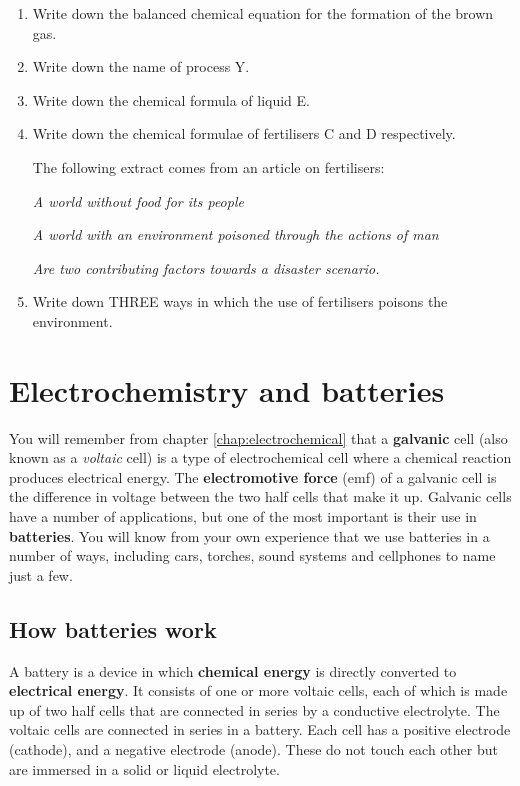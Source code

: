{\begin{enumerate}
\item{Write down the balanced chemical equation for the formation of the brown gas.}
\item{Write down the name of process Y.}
\item{Write down the chemical formula of liquid E.}
\item{Write down the chemical formulae of fertilisers C and D respectively.}

The following extract comes from an article on fertilisers:
\begin{center}
\textit{A world without food for its people}

\textit{A world with an environment poisoned through the actions of man }

\textit{Are two contributing factors towards a disaster scenario.}

\end{center}

\item{Write down THREE ways in which the use of fertilisers poisons the environment.}
\end{enumerate}

}

\section{Electrochemistry and batteries}
\label{sec:chemindustry:batteries}

You will remember from chapter \ref{chap:electrochemical} that a \textbf{galvanic} cell (also known as a \textit{voltaic} cell) is a type of electrochemical cell where a chemical reaction produces electrical energy. The \textbf{electromotive force} (emf) of a galvanic cell is the difference in voltage between the two half cells that make it up. Galvanic cells have a number of applications, but one of the most important is their use in \textbf{batteries}. You will know from your own experience that we use batteries in a number of ways, including cars, torches, sound systems and cellphones to name just a few.

\subsection{How batteries work}

A battery is a device in which \textbf{chemical energy} is directly converted to \textbf{electrical energy}. It consists of one or more voltaic cells, each of which is made up of two half cells that are connected in series by a conductive electrolyte. The voltaic cells are connected in series in a battery. Each cell has a positive electrode (cathode), and a negative electrode (anode). These do not touch each other but are immersed in a solid or liquid electrolyte.\\

